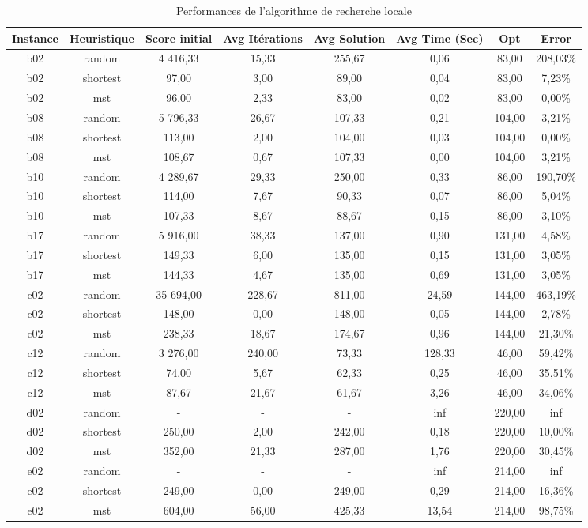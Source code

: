 \documentclass[10pt]{article}
\begin{document}
	\begin{table}[h!]
		\centering
		\begin{tabular}{|c|c|c|c|c|c|c|c|}
		\hline
\textbf{Instance} & \textbf{Heuristique} & \textbf{Score initial} & \textbf{Avg Itérations} & \textbf{Avg Solution} & \textbf{Avg Time (Sec)} & \textbf{Opt} & \textbf{Error} \\
\hline
b02 & random & 4 416,33 & 15,33 & 255,67 & 0,06 & 83,00 & 208,03\% \\
b02 & shortest & 97,00 & 3,00 & 89,00 & 0,04 & 83,00 & 7,23\% \\
b02 & mst & 96,00 & 2,33 & 83,00 & 0,02 & 83,00 & 0,00\% \\
b08 & random & 5 796,33 & 26,67 & 107,33 & 0,21 & 104,00 & 3,21\% \\
b08 & shortest & 113,00 & 2,00 & 104,00 & 0,03 & 104,00 & 0,00\% \\
b08 & mst & 108,67 & 0,67 & 107,33 & 0,00 & 104,00 & 3,21\% \\
b10 & random & 4 289,67 & 29,33 & 250,00 & 0,33 & 86,00 & 190,70\% \\
b10 & shortest & 114,00 & 7,67 & 90,33 & 0,07 & 86,00 & 5,04\% \\
b10 & mst & 107,33 & 8,67 & 88,67 & 0,15 & 86,00 & 3,10\% \\
b17 & random & 5 916,00 & 38,33 & 137,00 & 0,90 & 131,00 & 4,58\% \\
b17 & shortest & 149,33 & 6,00 & 135,00 & 0,15 & 131,00 & 3,05\% \\
b17 & mst & 144,33 & 4,67 & 135,00 & 0,69 & 131,00 & 3,05\% \\
c02 & random & 35 694,00 & 228,67 & 811,00 & 24,59 & 144,00 & 463,19\% \\
c02 & shortest & 148,00 & 0,00 & 148,00 & 0,05 & 144,00 & 2,78\% \\
c02 & mst & 238,33 & 18,67 & 174,67 & 0,96 & 144,00 & 21,30\% \\
c12 & random & 3 276,00 & 240,00 & 73,33 & 128,33 & 46,00 & 59,42\% \\
c12 & shortest & 74,00 & 5,67 & 62,33 & 0,25 & 46,00 & 35,51\% \\
c12 & mst & 87,67 & 21,67 & 61,67 & 3,26 & 46,00 & 34,06\% \\
d02 & random & - & - & - & inf & 220,00 & inf \\
d02 & shortest & 250,00 & 2,00 & 242,00 & 0,18 & 220,00 & 10,00\% \\
d02 & mst & 352,00 & 21,33 & 287,00 & 1,76 & 220,00 & 30,45\% \\
e02 & random & - & - & - & inf & 214,00 & inf \\
e02 & shortest & 249,00 & 0,00 & 249,00 & 0,29 & 214,00 & 16,36\% \\
e02 & mst & 604,00 & 56,00 & 425,33 & 13,54 & 214,00 & 98,75\% \\
		\end{tabular}
		\caption{Performances de l'algorithme de recherche locale}
		\label{tab-perfgen}
	\end{table}
\end{document}
